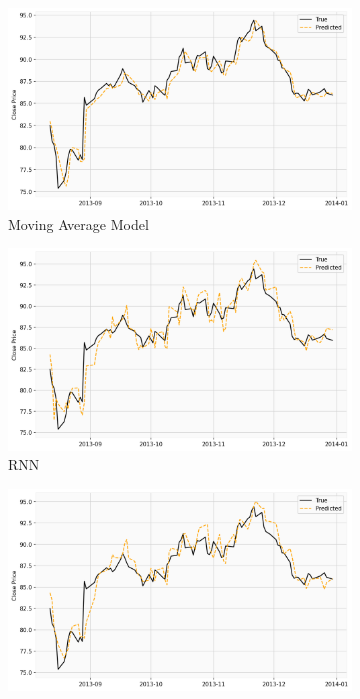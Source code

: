 \documentclass[utf8x]{ctexart}
\begin{document}
\begin{figure}[htb]
  \centering
  \begin{subfigure}[b]{0.48\textwidth}
    \centering
    \includegraphics[width=\textwidth]{../images/ma_prediction.png}
    \caption{Moving Average Model}
    \label{fig:ma_prediction}
  \end{subfigure}
  \begin{subfigure}[b]{0.48\textwidth}
    \centering
    \includegraphics[width=\textwidth]{../images/rnn_prediction.png}
    \caption{RNN}
    \label{fig:rnn_prediction}
  \end{subfigure}
  \begin{subfigure}[b]{0.48\textwidth}
    \centering
    \includegraphics[width=\textwidth]{../images/lstm_prediction.png}

\end{subfigure}
\end{figure}
\end{document}
